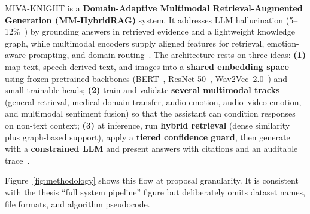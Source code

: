 \documentclass[12pt, a4paper]{article}
\begin{document}
MIVA-KNIGHT is a \textbf{Domain-Adaptive Multimodal Retrieval-Augmented
Generation (MM-HybridRAG)} system. It addresses LLM hallucination
(5--12\%~\cite{zhang2023sirens,ji2023survey}) by grounding answers in retrieved
evidence and a lightweight knowledge graph, while multimodal encoders supply
aligned features for retrieval, emotion-aware prompting, and domain
routing~\cite{kadam2022multimodal,sarmah2024hybridrag}. The architecture
rests on three ideas: \textbf{(1)} map text, speech-derived text, and images into
a \textbf{shared embedding space} using frozen pretrained backbones
(BERT~\cite{devlin2019bert}, ResNet-50~\cite{he2016deep},
Wav2Vec~2.0~\cite{baevski2020wav2vec}) and small trainable heads;
\textbf{(2)} train and validate \textbf{several multimodal tracks} (general
retrieval, medical-domain transfer, audio emotion, audio--video emotion, and
multimodal sentiment fusion) so that the assistant can condition responses on
non-text context; \textbf{(3)} at inference, run \textbf{hybrid retrieval}
(dense similarity plus graph-based support), apply a \textbf{tiered confidence
guard}, then generate with a \textbf{constrained LLM} and present answers with
citations and an auditable trace~\cite{pan2024unifying,lewis2020rag}.

Figure~\ref{fig:methodology} shows this flow at proposal granularity. It is
consistent with the thesis ``full system pipeline'' figure but deliberately omits
dataset names, file formats, and algorithm pseudocode.
\end{document}
